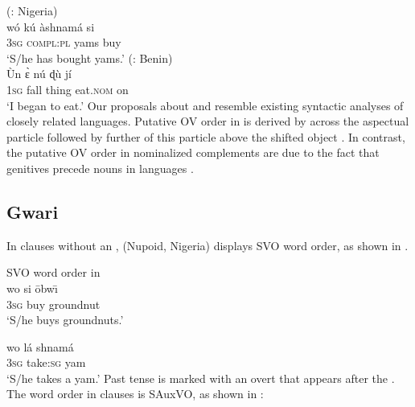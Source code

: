 \documentclass[output=paper,newtxmath,modfonts,nonflat,draftmode]{langsci/langscibook}
\begin{document}
\ea  \label{ex:9a:gwari}  (: Nigeria)	\\
\gll wó kú \`{a}shnamá si \\
3\textsc{sg} \textsc{compl:pl} yams buy \\
\glt `S/he has bought yams.' \hfill \citep[][56]{hyman1970}
\ex \label{ex:9b:fongbe}
 (: Benin)	\\
\gll Ùn {\`ɛ} {nú} {ɖù} jí  \\
1\textsc{sg} fall thing eat.\textsc{nom} on  \\
\glt `I began to eat.' \hfill \citep[][215]{lefebvre2002}
\z
\z 
Our proposals about  and  resemble existing syntactic analyses of closely related languages. Putative OV order in  is derived by  across the aspectual particle followed by further  of this particle above the shifted object \citep{manfredi97,kandy03,aboh09}. In contrast, the putative OV order in  nominalized complements are due to the fact that genitives precede nouns in  languages \citep{aboh05}.

%
%

\subsection{Gwari}

In clauses without an ,  (Nupoid, Nigeria) displays SVO word order, as shown in .

\ea \label{ex:10:gwari}
SVO word order in 	\\
\ea 
\gll wo si \=obw\=\i \\
3\textsc{sg} buy groundnut \\
\glt `S/he buys groundnuts.' \hfill \citep[][51]{hyman1970}	

\ex \gll wo lá shnamá \\
3\textsc{sg} take:\textsc{sg} yam \\
\glt `S/he takes a yam.' \hfill \citep[][51]{hyman1970}	
\z
\z
Past tense is marked with an overt  that appears after the . The word order in  clauses is SAuxVO, as shown in :
\end{document}

